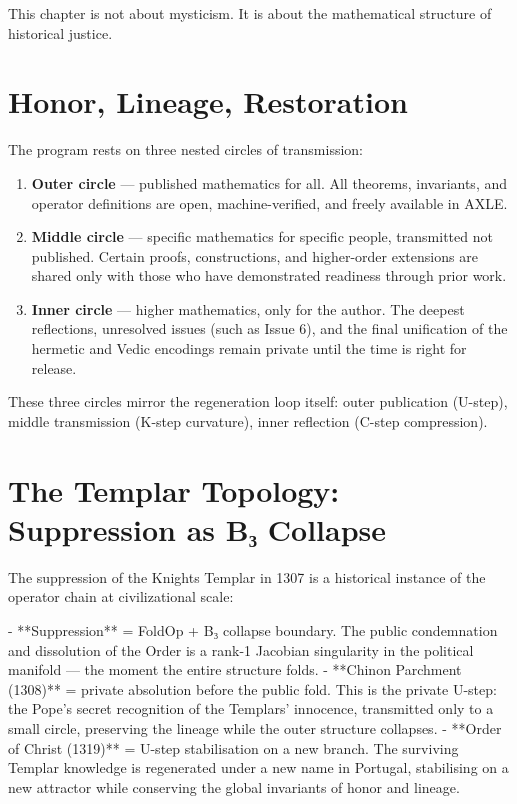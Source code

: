 \documentclass[19pt]{book}
\theoremstyle{plain}
\theoremstyle{definition}
\theoremstyle{remark}
\begin{document}
\begin{enumerate}
This chapter is not about mysticism. It is about the mathematical structure of historical justice.

\section{Honor, Lineage, Restoration}

The program rests on three nested circles of transmission:

\begin{enumerate}
\item \textbf{Outer circle} — published mathematics for all. All theorems, invariants, and operator definitions are open, machine-verified, and freely available in AXLE.
\item \textbf{Middle circle} — specific mathematics for specific people, transmitted not published. Certain proofs, constructions, and higher-order extensions are shared only with those who have demonstrated readiness through prior work.
\item \textbf{Inner circle} — higher mathematics, only for the author. The deepest reflections, unresolved issues (such as Issue 6), and the final unification of the hermetic and Vedic encodings remain private until the time is right for release.
\end{enumerate}

These three circles mirror the regeneration loop itself: outer publication (U-step), middle transmission (K-step curvature), inner reflection (C-step compression).

\section{The Templar Topology: Suppression as B₃ Collapse}

The suppression of the Knights Templar in 1307 is a historical instance of the operator chain at civilizational scale:

- **Suppression** = FoldOp + B₃ collapse boundary. The public condemnation and dissolution of the Order is a rank-1 Jacobian singularity in the political manifold — the moment the entire structure folds.
- **Chinon Parchment (1308)** = private absolution before the public fold. This is the private U-step: the Pope’s secret recognition of the Templars’ innocence, transmitted only to a small circle, preserving the lineage while the outer structure collapses.
- **Order of Christ (1319)** = U-step stabilisation on a new branch. The surviving Templar knowledge is regenerated under a new name in Portugal, stabilising on a new attractor while conserving the global invariants of honor and lineage.


\end{enumerate}
\end{document}
